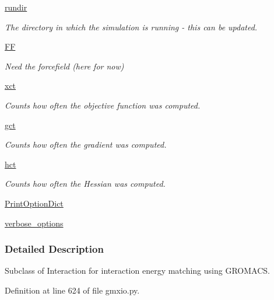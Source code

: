 \begin{DoxyCompactItemize}
\hyperlink{classforcebalance_1_1target_1_1Target_a6872de5b2d4273b82336ea5b0da29c9e}{rundir}
\begin{DoxyCompactList}\small\item\em The directory in which the simulation is running -\/ this can be updated. \end{DoxyCompactList}\item 
\hyperlink{classforcebalance_1_1target_1_1Target_a38a37919783141ea37fdcf8b00ce0aaf}{F\-F}
\begin{DoxyCompactList}\small\item\em Need the forcefield (here for now) \end{DoxyCompactList}\item 
\hyperlink{classforcebalance_1_1target_1_1Target_aad2e385cfbf7b4a68f1c2cb41133fe82}{xct}
\begin{DoxyCompactList}\small\item\em Counts how often the objective function was computed. \end{DoxyCompactList}\item 
\hyperlink{classforcebalance_1_1target_1_1Target_aa625ac88c6744eb14ef281d9496d0dbb}{gct}
\begin{DoxyCompactList}\small\item\em Counts how often the gradient was computed. \end{DoxyCompactList}\item 
\hyperlink{classforcebalance_1_1target_1_1Target_a5b5a42f78052b47f29ed4b940c6111a1}{hct}
\begin{DoxyCompactList}\small\item\em Counts how often the Hessian was computed. \end{DoxyCompactList}\item 
\hyperlink{classforcebalance_1_1BaseClass_afc6659278497d7245bc492ecf405ccae}{Print\-Option\-Dict}
\item 
\hyperlink{classforcebalance_1_1BaseClass_afd68efa29ccd2f320f4cf82198214aac}{verbose\-\_\-options}
\end{DoxyCompactItemize}


\subsubsection{Detailed Description}
Subclass of Interaction for interaction energy matching using G\-R\-O\-M\-A\-C\-S. 



Definition at line 624 of file gmxio.\-py.



